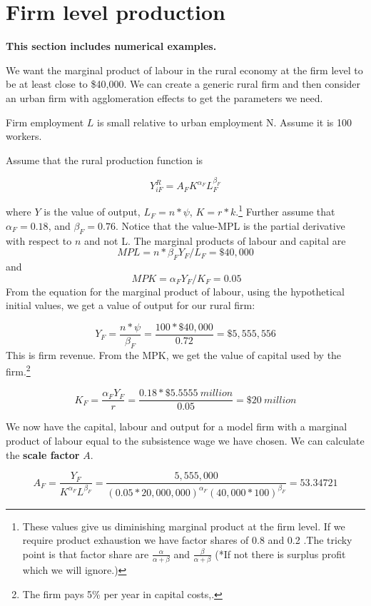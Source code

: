 



\section{Firm level production}  
 \textbf{This section includes numerical examples.
 }


We want the marginal product of labour in the rural economy at the firm level to be at least close to \$40,000.  We can create a generic rural firm and then consider an urban firm with agglomeration effects to get the parameters we need. 

Firm employment $L$ is small relative to  urban employment {N}. Assume it is 100 workers. 

Assume that the rural production function is 

\[ Y_{iF}^R=A_{F} K^{\alpha_F} L_F^{\beta_F} \]

where $Y$ is the value of output, $L_F=n*\psi$, $K=r*k$.\footnote{These values give us diminishing marginal product at the firm level. If we require product exhaustion we have factor shares of  0.8 and 0.2 .The tricky point is that factor share are 
 $\frac{\alpha}{\alpha + \beta}$ and $\frac{\beta}{\alpha + \beta}$
(*If not there is surplus profit  which we will ignore.)}
Further assume that $\alpha_F=0.18 $,  and $\beta_F=0.76$. Notice that the value-MPL is the partial derivative with respect to $n$ and not L. 
The marginal products of labour and capital are 
\[MPL=n*\beta_F Y_F/L_F=\$40,000\] and\[\ MPK=\alpha_F Y_F/K_F =0.05\]
From the equation for the marginal product of labour, using the hypothetical initial values, we get a value of output for our rural firm:

\[Y_F=\frac{n*\psi}{\beta_F}=\frac{100*\$40,000}{0.72}=\$5,555,556\]
This is firm revenue. From the MPK, we get the value of capital used by the firm.\footnote{The firm pays 5\% per year in capital costs,.} 

\[K_F=  \frac{\alpha_F Y_F }{r}=\frac{0.18 *\$5.5555\ million}{0.05} =\$20\ million \]

We now have the capital, labour and output for a model firm with a marginal product of labour  equal to the subsistence wage we have chosen. We can calculate the \textbf{scale factor} $A$.

\begin{equation}  
A_F= \frac{Y_F}{K^{\alpha_F} L^{\beta_F}}=\frac{5,555,000}
{(0.05*20,000,000)^{\alpha_F} (40,000*100)^{\beta_F}} =53.34721 \label{eqn-AR}\end{equation} 

